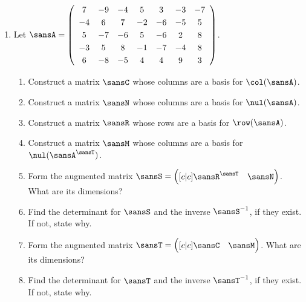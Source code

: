 \documentclass[12 pt]{article}
\begin{document}
\begin{enumerate}[leftmargin=0in, rightmargin=-0.25in]
	\item Let $\sansA=\left(
	\begin{array}{ccccccc}
	7 & -9 & -4 & 5 & 3 & -3 & -7 \\
	-4 & 6 & 7 & -2 & -6 & -5 & 5 \\
	5 & -7 & -6 & 5 & -6 & 2 & 8 \\
	-3 & 5 & 8 & -1 & -7 & -4 & 8 \\
	6 & -8 & -5 & 4 & 4 & 9 & 3 \\
	\end{array}
	\right)$.
	\begin{enumerate}[itemsep=20mm,topsep=6mm]
		\item Construct a matrix $\sansC$ whose columns are a basis for $\col(\sansA)$.
		\item Construct a matrix $\sansN$ whose columns are a basis for $\nul(\sansA)$.
		\item Construct a matrix $\sansR$ whose rows are a basis for $\row(\sansA)$.
		\item Construct a matrix $\sansM$ whose columns are a basis for $\nul(\sansA^\sansT)$.
		\item Form the augmented matrix $\sansS=\pmatgrid{c|c}{\sansR^\sansT & \sansN}$. What are its dimensions?
		\item Find the determinant for $\sansS$ and the inverse $\sansS^{-1}$, if they exist. If not, state why.
		\item Form the augmented matrix $\sansT=\pmatgrid{c|c}{\sansC & \sansM}$. What are its dimensions?
		\item Find the determinant for $\sansT$ and the inverse $\sansT^{-1}$, if they exist. If not, state why.
	\end{enumerate}
\end{enumerate}
\end{document}
